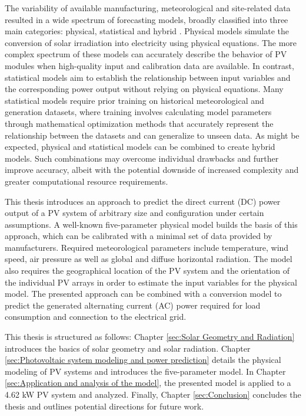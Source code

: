 The variability of available manufacturing, meteorological and site-related data
resulted in a wide spectrum of forecasting models, broadly classified
into three main categories: physical, statistical and hybrid \cite{Ulbricht2013, Iheanetu2022}. 
Physical models simulate the conversion of solar irradiation into electricity
using physical equations. The more complex spectrum of these models can accurately describe
the behavior of PV modules when high-quality input and calibration data are available.
In contrast, statistical models aim to establish the relationship between input
variables and the corresponding power output without relying on physical equations.
Many statistical models require prior training on historical meteorological
and generation datasets, where training involves calculating model parameters
through mathematical optimization methods that accurately represent the
relationship between the datasets and can generalize to unseen data.
As might be expected, physical and statistical models can be combined to
create hybrid models. Such combinations may overcome individual drawbacks
and further improve accuracy, albeit with the potential downside of increased
complexity and greater computational resource requirements.

This thesis introduces an approach to predict the direct current
(DC) power output of a PV system of arbitrary size and configuration under
certain assumptions. A well-known five-parameter physical model
builds the basis of this approach, which can be calibrated with a
minimal set of data provided by manufacturers. Required meteorological
parameters include temperature, wind speed, air pressure as well as global
and diffuse horizontal radiation. The model also requires the geographical
location of the PV system and the orientation of the individual PV arrays in
order to estimate the input variables for the physical model. The 
presented approach can be combined with a conversion model to predict
the generated alternating current (AC) power required for load consumption
and connection to the electrical grid.

This thesis is structured as follows: Chapter \ref{sec:Solar Geometry and Radiation}
introduces the basics of solar geometry and solar radiation. Chapter 
\ref{sec:Photovoltaic system modeling and power prediction} details
the physical modeling of PV systems and introduces the five-parameter model.
In Chapter \ref{sec:Application and analysis of the model}, the presented model is
applied to a 4.62 kW PV system and analyzed. Finally, Chapter \ref{sec:Conclusion}
concludes the thesis and outlines potential directions for future work.
